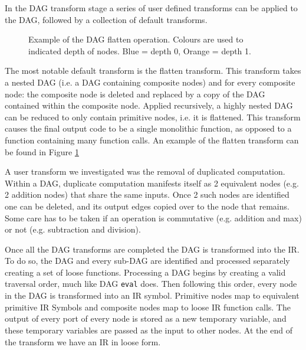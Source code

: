 In the DAG transform stage a series of user defined transforms can be applied to the DAG, followed by a collection of default transforms.

\begin{figure}[h!]
    \centering
    \hspace{1em}
    \hspace{1em}
    \caption{Example of the DAG flatten operation. Colours are used to indicated depth of nodes. Blue = depth 0, Orange = depth 1.}\label{fig:flatten_example}
\end{figure}

The most notable default transform is the flatten transform.
This transform takes a nested DAG (i.e. a DAG containing composite nodes) and for every composite node: the composite node is deleted and replaced by a copy of the DAG contained within the composite node.
Applied recursively, a highly nested DAG can be reduced to only contain primitive nodes, i.e. it is flattened.
This transform causes the final output code to be a single monolithic function, as opposed to a function containing many function calls.
An example of the flatten transform can be found in Figure \ref{fig:flatten_example}

A user transform we investigated was the removal of duplicated computation.
Within a DAG, duplicate computation manifests itself as 2 equivalent nodes (e.g. 2 addition nodes) that share the same inputs.
Once 2 such nodes are identified one can be deleted, and its output edges copied over to the node that remains.
Some care has to be taken if an operation is commutative (e.g. addition and max) or not (e.g. subtraction and division).

Once all the DAG transforms are completed the DAG is transformed into the IR.
To do so, the DAG and every sub-DAG are identified and processed separately creating a set of loose functions.
Processing a DAG begins by creating a valid traversal order, much like DAG \texttt{eval} does.
Then following this order, every node in the DAG is transformed into an IR symbol.
Primitive nodes map to equivalent primitive IR Symbols and composite nodes map to loose IR function calls.
The output of every port of every node is stored as a new temporary variable, and these temporary variables are passed as the input to other nodes.
At the end of the transform we have an IR in loose form.

